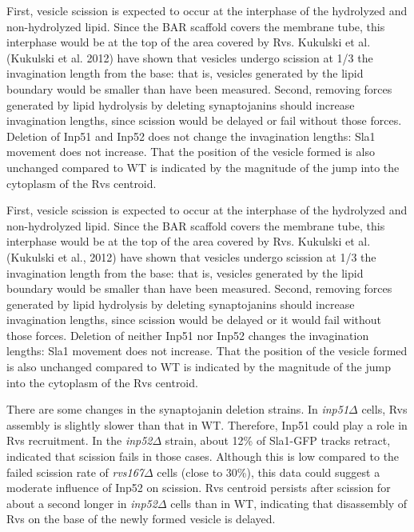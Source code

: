 \vspace{5mm}

First, vesicle scission is expected to occur at the interphase of the hydrolyzed and non-hydrolyzed lipid. Since the BAR scaffold covers the membrane tube, this interphase would be at the top of the area covered by Rvs. Kukulski et al. (Kukulski et al. 2012) have shown that vesicles undergo scission at 1/3 the invagination length from the base: that is, vesicles generated by the lipid boundary would be smaller than have been measured. Second, removing forces generated by lipid hydrolysis by deleting synaptojanins should increase invagination lengths, since scission would be delayed or fail without those forces. Deletion of Inp51 and Inp52 does not change the invagination lengths: Sla1 movement does not increase. That the position of the vesicle formed is also unchanged compared to WT is indicated by the magnitude of the jump into the cytoplasm of the Rvs centroid. 

\vspace{5mm}

First, vesicle scission is expected to occur at the interphase of the hydrolyzed and non-hydrolyzed lipid. Since the BAR scaffold covers the membrane tube, this interphase would be at the top of the area covered by Rvs. Kukulski et al. (Kukulski et al., 2012) have shown that vesicles undergo scission at 1/3 the invagination length from the base: that is, vesicles generated by the lipid boundary would be smaller than have been measured. Second, removing forces generated by lipid hydrolysis by deleting synaptojanins should increase invagination lengths, since scission would be delayed or it would fail without those forces. Deletion of neither Inp51 nor Inp52 changes the invagination lengths: Sla1 movement does not increase. That the position of the vesicle formed is also unchanged compared to WT is indicated by the magnitude of the jump into the cytoplasm of the Rvs centroid. 


\vspace{5mm}
There are some changes in the synaptojanin deletion strains. In \textit{inp51$\Delta$} cells, Rvs assembly is slightly slower than that in WT. Therefore, Inp51 could play a role in Rvs recruitment. In the \textit{inp52$\Delta$} strain, about 12\% of Sla1-GFP tracks retract, indicated that scission fails in those cases. Although this is low compared to the failed scission rate of \textit{rvs167$\Delta$} cells (close to 30\%), this data could suggest a moderate influence of Inp52 on scission. Rvs centroid persists after scission for about a second longer in \textit{inp52$\Delta$} cells than in WT, indicating that disassembly of Rvs on the base of the newly formed vesicle is delayed.

